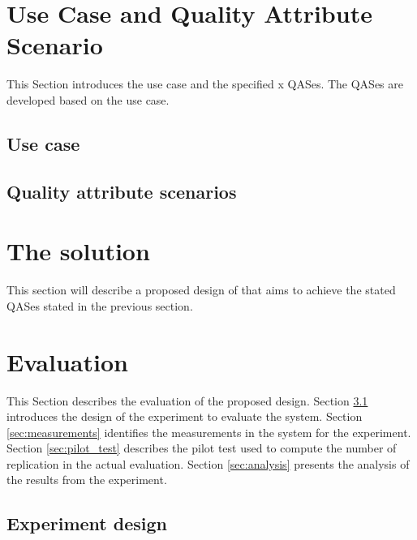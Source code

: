 \documentclass[conference]{IEEEtran}
\begin{document}
\section{Use Case and Quality Attribute Scenario}
\label{sec:use_case_and_qas}
This Section introduces the use case and the specified x QASes.
The QASes are developed based on the use case.

\subsection{Use case}
\label{sec:use_case}





\subsection{Quality attribute scenarios}
\label{sec:qas}










\section{The solution}
\label{sec:middleware_architecture}


This section will describe a proposed design of that aims to achieve the stated QASes stated in the previous section.






\section{Evaluation}
\label{sec:evaluation}
This Section describes the evaluation of the proposed design.
Section \ref{sec:design} introduces the design of the experiment to evaluate the system.
Section \ref{sec:measurements} identifies the measurements in the system for the experiment.
Section \ref{sec:pilot_test} describes the pilot test used to compute the number of replication in the actual evaluation.
Section \ref{sec:analysis} presents the analysis of the results from the experiment.


\subsection{Experiment design}
\label{sec:design}
\end{document}
